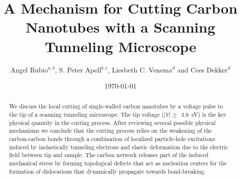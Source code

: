 \newcommand\be{\begin{equation}}
\newcommand\ee{\end{equation}}
\newcommand\bea{\begin{eqnarray}}
\newcommand\eea{\end{eqnarray}}
\newcommand\ba{\begin{array}}
\newcommand\ea{\end{array}}
\newcommand\half{\frac{1}{2}}


\draft

\title{A Mechanism for Cutting Carbon Nanotubes with a Scanning Tunneling Microscope}
\author{ Angel Rubio$^{a,b}$, S. Peter Apell$^{b,c}$, Liesbeth C. Venema$^{d}$ and Cees Dekker$^{d}$}
\bigskip
\address{ a. Departamento de F\'{\i}sica Te\'{o}rica, Universidad de Valladolid,  E-47011 Valladolid, Spain\\ b. Departamento de F\'{\i}sica de Materiales, Euskal Herriko Unibertsitatea  Aptdo. 1072 San Sebastian 20080, Basque Country \\  and Donostia International Physics Center, San Sebastian, Spain \\ c. Department of Applied Physics, Chalmers University of Technology  and G\"{o}teborg University, S-41296 G\"{o}teborg, Sweden \\ d. Department of Applied Sciences and DIMES, Delft University of  Technology, Lorentzweg 1, 2628 CJ Delft, The Netherlands }
\date{\today}
\maketitle

\widetext

\begin{abstract}
We discuss the local cutting of single-walled carbon nanotubes by
a voltage pulse to the tip of a scanning tunneling microscope. The
tip voltage ($\mid V \mid \ge $~3.8~eV) is the key physical
quantity in the cutting process. After reviewing several possible
physical mechanisms we conclude that the cutting process relies on
the weakening of the carbon-carbon bonds through a combination of
localized particle-hole excitations induced by inelastically
tunneling electrons and elastic deformation due to the electric
field between tip and sample. The carbon network releases part of
the induced mechanical stress by forming topological defects that
act as nucleation centers for the formation of dislocations that
dynamically propagate towards bond-breaking.
\end{abstract}

